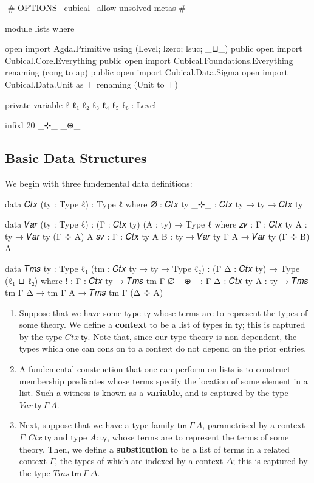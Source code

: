 \begin{code}[hide]
{-# OPTIONS --cubical --allow-unsolved-metas #-}

module lists where

open import Agda.Primitive using (Level; lzero; lsuc; _⊔_) public
open import Cubical.Core.Everything public
open import Cubical.Foundations.Everything renaming (cong to ap) public
open import Cubical.Data.Sigma
open import Cubical.Data.Unit as ⊤ renaming (Unit to ⊤)

private
  variable
    ℓ ℓ₁ ℓ₂ ℓ₃ ℓ₄ ℓ₅ ℓ₆ : Level

infixl 20 _⊹_ _⊕_
\end{code}

\clearpage

\subsection{Basic Data Structures}

We begin with three fundemental data definitions:
\begin{code}
data 𝐶𝑡𝑥 (ty : Type ℓ) : Type ℓ where
  ∅ : 𝐶𝑡𝑥 ty
  _⊹_ : 𝐶𝑡𝑥 ty → ty → 𝐶𝑡𝑥 ty

data 𝑉𝑎𝑟 (ty : Type ℓ) : (Γ : 𝐶𝑡𝑥 ty) (A : ty) → Type ℓ where
  𝑧𝑣 : {Γ : 𝐶𝑡𝑥 ty} {A : ty} → 𝑉𝑎𝑟 ty (Γ ⊹ A) A
  𝑠𝑣 : {Γ : 𝐶𝑡𝑥 ty} {A B : ty} → 𝑉𝑎𝑟 ty Γ A → 𝑉𝑎𝑟 ty (Γ ⊹ B) A

data 𝑇𝑚𝑠 {ty : Type ℓ₁} (tm : 𝐶𝑡𝑥 ty → ty → Type ℓ₂)
     : (Γ Δ : 𝐶𝑡𝑥 ty) → Type (ℓ₁ ⊔ ℓ₂) where
  ! : {Γ : 𝐶𝑡𝑥 ty} → 𝑇𝑚𝑠 tm Γ ∅
  _⊕_ : {Γ Δ : 𝐶𝑡𝑥 ty} {A : ty} → 𝑇𝑚𝑠 tm Γ Δ → tm Γ A → 𝑇𝑚𝑠 tm Γ (Δ ⊹ A)
\end{code}
\begin{enumerate}
\item Suppose that we have some type $\mathsf{ty}$ whose terms are to represent
the types of some theory. We define a \textbf{context} to be a list of types in
$\mathsf{ty}$; this is captured by the type $\mathit{Ctx}~\mathsf{ty}$. Note
that, since our type theory is non-dependent, the types which one can cons on to
a context do not depend on the prior entries.

\item A fundemental construction that one can perform on lists is to construct
membership predicates whose terms specify the location of some element in a
list. Such a witness is known as a \textbf{variable}, and is captured by the
type $\mathit{Var}~\mathsf{ty}~\Gamma~A$.

\item Next, suppose that we have a type family $\mathsf{tm}~\Gamma~A$,
parametrised by a context $\Gamma : \mathit{Ctx}~\mathsf{ty}$ and type $A :
\mathsf{ty}$, whose terms are to represent the terms of some theory. Then, we
define a \textbf{substitution} to be a list of terms in a related context
$\Gamma$, the types of which are indexed by a context $\Delta$; this is captured
by the type $\mathit{Tms}~\mathsf{tm}~\Gamma~\Delta$.
\end{enumerate}


